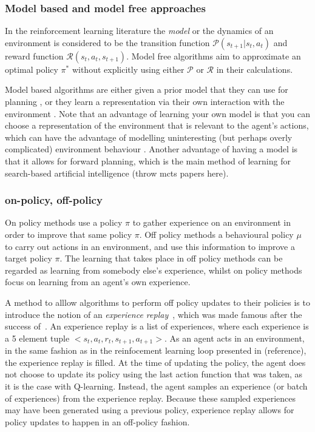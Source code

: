 \documentclass{../main.tex}{subfiles}
\begin{document}
\subsubsection{Model based and model free approaches}
In the reinforcement learning literature the \textit{model} or the dynamics of an environment is considered to be the transition function $\mathcal{P}(s_{t+1} | s_t, a_t)$ and reward function $\mathcal{R}(s_t, a_t, s_{t+1})$. Model free algorithms aim to approximate an optimal policy $\pi^*$ without explicitly using either $\mathcal{P}$ or $\mathcal{R}$ in their calculations.

Model based algorithms are either given a prior model that they can use for planning \citep{browne2012survey, Soemers2014}, or they learn a representation via their own interaction with the environment \citep{Sutton1991, Guzdial2017, Deisenroth2011}. Note that an advantage of learning your own model is that you can choose a representation of the environment that is relevant to the agent's actions, which can have the advantage of modelling uninteresting (but perhaps overly complicated) environment behaviour \citep{Pathak2017}. Another advantage of having a model is that it allows for forward planning, which is the main method of learning for search-based artificial intelligence (throw mcts papers here).


\subsubsection{on-policy, off-policy}



On policy methods use a policy $\pi$ to gather experience on an environment in order to improve that same policy $\pi$. Off policy methods a behavioural policy $\mu$ to carry out actions in an environment, and use this information to improve a target policy $\pi$. The learning that takes place in off policy methods can be regarded as learning from somebody else's experience, whilst on policy methods focus on learning from an agent's own experience.

A method to alllow algorithms to perform off policy updates to their policies is to introduce the notion of an \textit{experience replay}~\citep{Lin1993}, which was made famous after the success of~\cite{Mnih2013}. An experience replay is a list of experiences, where each experience is a 5 element tuple $<s_t, a_t, r_t, s_{t+1}, a_{t+1}>$. As an agent acts in an environment, in the same fashion as in the reinfocement learning loop presented in (reference), the experience replay is filled. At the time of updating the policy, the agent does not choose to update its policy using the last action function that was taken, as it is the case with Q-learning. Instead, the agent samples an experience (or batch of experiences) from the experience replay. Because these sampled experiences may have been generated using a previous policy, experience replay allows for policy updates to happen in an off-policy fashion.
\end{document}
